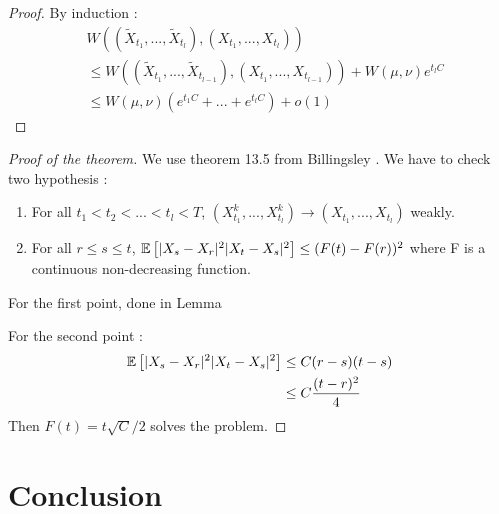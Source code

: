 \documentclass{article}
\begin{document}
\begin{proof}
  By induction :
  \begin{align}
    & W((\tilde X_{t_{1}}, ..., \tilde X_{t_{l}}), (X_{t_{1}}, ..., X_{t_{l}}))
    \\ &\leq  W((\tilde X_{t_{1}}, ..., \tilde X_{t_{l-1}}), (X_{t_{1}}, ..., X_{t_{l-1}})) + W(\mu,\nu)e^{t_{l}C}
    \\ &\leq W(\mu,\nu)(e^{t_{1}C}+...+e^{t_{l}C}) + o(1)
  \end{align}
\end{proof}



\begin{proof}[Proof of the theorem]
  We use theorem 13.5 from Billingsley . We have to check two hypothesis :
  \begin{enumerate}
  \item For all $t_{1}<t_{2}<...<t_{l}<T$, $(X_{t_{1}}^{k}, ..., X_{t_{l}}^{k}) \rightarrow (X_{t_{1}}, ..., X_{t_{l}})$ weakly.
  \item For all $r \leq s \leq t$, $\mathbb{E}\left[|X_{s}-X_{r}|^{2}|X_{t}-X_{s}|^{2}\right] \leq (F(t) - F(r))^{2}$ where F is a continuous non-decreasing function.
  \end{enumerate}
  For the first point, done in Lemma
  
  For the second point :
  \begin{align}
    \mathbb{E}\left[|X_{s}-X_{r}|^{2}|X_{t}-X_{s}|^{2}\right] &\leq C(r-s)(t-s)\\
    &\leq C\frac{(t-r)^{2}}{4}
  \end{align}
  Then $F(t) = t\sqrt{C}/2$ solves the problem.
\end{proof}





\section{Conclusion}
\label{sec:conclusion}
\end{document}
